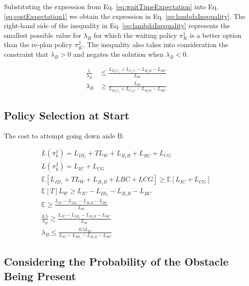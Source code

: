 \documentclass[a4paper,12pt]{article}
\begin{document}
			Substituting the expression from Eq. \ref{eq:waitTimeExpectation} into Eq. \ref{eq:costExpectation1} we obtain the expression in Eq. \ref{eq:lambdaInequality}. The right-hand side of the inequality in Eq. \ref{eq:lambdaInequality} represents the smallest possible value for $\lambda_{B}$ for which the waiting policy $\pi_K^1$ is a better option than the re-plan policy $\pi_K^2$. The inequality also takes into consideration the constraint that $\lambda_{B} > 0$ and negates the solution when $\lambda_{B} < 0$.

			\begin{equation}
				\begin{split}
					\frac{1}{\lambda_{B}} & \leq \frac{L_{B_{1}C_{1}} + L_{C_{1}C} - L_{B_{1}B} - L_{BC}}{L_W} \\	
					\lambda_{B} & \geq \frac{L_W}{L_{B_{1}C_{1}} + L_{C_{1}C} - L_{B_{1}B} - L_{BC}}
				\end{split}
				\label{eq:lambdaInequality}
			\end{equation}

		\subsection{Policy Selection at Start}
			The cost to attempt going down aisle B:

			\begin{equation}
				\begin{split}
				L(\pi_k^1) =L_{IB_1}+TL_W+L_{B_1B}+L_{BC}+L_{CG}\\
				L(\pi_k^2) = L_{IC}+L_{CG}\\
				\mathbb{E}[L_{IB_1}+TL_W + L_{B_1B}+L{BC}+L{CG}] \geq \mathbb{E}[L_{IC}+L_{CG}]\\
				\mathbb{E}[T]L_W \geq L_{IC}-L_{IB_1}-L_{B_1B}-L_{BC}\\
				\mathbb{E} \geq \frac{L_{IC}-L_{IB_1}-L_{B_1B}-L_{BC}}{L_W}\\
				\frac{0.5}{\lambda_B} \geq \frac{L_{IC}-L_{IB_1}-L_{B_1B}-L_{BC}}{L_W}\\
				\lambda_B \leq \frac{0.5L_W}{L_{IC}-L_{IB_1}-L_{B_1B}-L_{BC}}
				\end{split}
			\end{equation}

		\subsection{Considering the Probability of the Obstacle Being Present}
\end{document}
